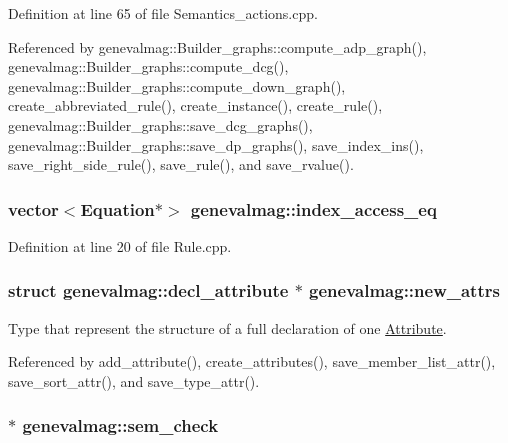 Definition at line 65 of file Semantics\_\-actions.cpp.



Referenced by genevalmag::Builder\_\-graphs::compute\_\-adp\_\-graph(), genevalmag::Builder\_\-graphs::compute\_\-dcg(), genevalmag::Builder\_\-graphs::compute\_\-down\_\-graph(), create\_\-abbreviated\_\-rule(), create\_\-instance(), create\_\-rule(), genevalmag::Builder\_\-graphs::save\_\-dcg\_\-graphs(), genevalmag::Builder\_\-graphs::save\_\-dp\_\-graphs(), save\_\-index\_\-ins(), save\_\-right\_\-side\_\-rule(), save\_\-rule(), and save\_\-rvalue().

\hypertarget{namespacegenevalmag_a4bc1208b99175d15ec86291f80f5428f}{
\subsubsection[{index\_\-access\_\-eq}]{\setlength{\rightskip}{0pt plus 5cm}vector$<${\bf Equation}$\ast$$>$ {\bf genevalmag::index\_\-access\_\-eq}}}
\label{namespacegenevalmag_a4bc1208b99175d15ec86291f80f5428f}


Definition at line 20 of file Rule.cpp.

\hypertarget{namespacegenevalmag_a3564619b24ff1e9243dee9e501181679}{
\subsubsection[{new\_\-attrs}]{\setlength{\rightskip}{0pt plus 5cm}struct {\bf genevalmag::decl\_\-attribute} $\ast$ {\bf genevalmag::new\_\-attrs}}}
\label{namespacegenevalmag_a3564619b24ff1e9243dee9e501181679}
Type that represent the structure of a full declaration of one \hyperlink{classgenevalmag_1_1Attribute}{Attribute}. 

Referenced by add\_\-attribute(), create\_\-attributes(), save\_\-member\_\-list\_\-attr(), save\_\-sort\_\-attr(), and save\_\-type\_\-attr().

\hypertarget{namespacegenevalmag_ad93efa78140ac10eefb71fdb44c48b6b}{
\subsubsection[{sem\_\-check}]{$\ast$ {\bf genevalmag::sem\_\-check}}}
\label{namespacegenevalmag_ad93efa78140ac10eefb71fdb44c48b6b}


